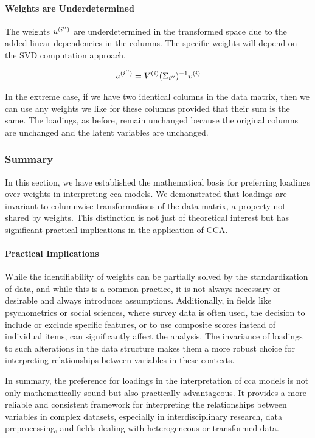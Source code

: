 \paragraph{Weights are Underdetermined}
The weights \( u^{(i'')} \) are underdetermined in the transformed space due to the added linear dependencies in the columns. The specific weights will depend on the SVD computation approach.

\begin{align}
    u^{(i'')} = V^{(i)}(\Sigma_{i''})^{-1}v^{(i)} \label{eq:weights_change}
\end{align}

In the extreme case, if we have two identical columns in the data matrix, then we can use any weights we like for these columns provided that their sum is the same.
The loadings, as before, remain unchanged because the original columns are unchanged and the latent variables are unchanged.

\subsubsection{Summary}

In this section, we have established the mathematical basis for preferring \gls{loadings} over weights in interpreting \acrshort{cca} models.
We demonstrated that \gls{loadings} are invariant to columnwise transformations of the data matrix, a property not shared by weights.
This distinction is not just of theoretical interest but has significant practical implications in the application of CCA.

\paragraph{Practical Implications}

While the identifiability of weights can be partially solved by the standardization of data, and while this is a common practice, it is not always necessary or desirable and always introduces assumptions.
Additionally, in fields like psychometrics or social sciences, where survey data is often used, the decision to include or exclude specific features, or to use composite scores instead of individual items, can significantly affect the analysis.
The invariance of \gls{loadings} to such alterations in the data structure makes them a more robust choice for interpreting relationships between variables in these contexts.

In summary, the preference for \gls{loadings} in the interpretation of \acrshort{cca} models is not only mathematically sound but also practically advantageous.
It provides a more reliable and consistent framework for interpreting the relationships between variables in complex datasets, especially in interdisciplinary research, data preprocessing, and fields dealing with heterogeneous or transformed data.

